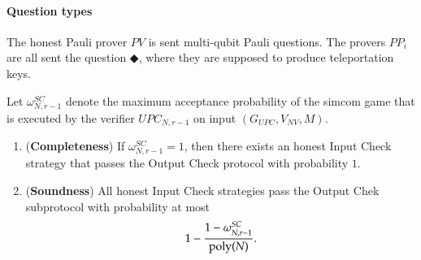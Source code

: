 \paragraph{Question types} 
The honest Pauli prover $PV$ is sent multi-qubit Pauli questions. The provers $PP_i$ are all sent the question $\Diamondblack$, where they are supposed to produce teleportation keys.

\begin{lemma}	
\label{lem:output_check}
Let $\omega_{N,r-1}^{SC}$ denote the maximum acceptance probability of the simcom game that is executed by the verifier $UPC_{N,r-1}$ on input $(G_{UPC},V_{NV},M)$. 
\begin{enumerate}
	\item (\textbf{Completeness}) If $\omega_{N,r-1}^{SC} = 1$, then there exists an honest Input Check strategy that passes the Output Check protocol with probability $1$.
	
	\item (\textbf{Soundness}) All honest Input Check strategies pass the Output Chek subprotocol with probability at most 
\[
	1 - \frac{1 - \omega_{N,r-1}^{SC}}{\operatorname{poly}(N)}.
\] 
\end{enumerate}
\end{lemma}
